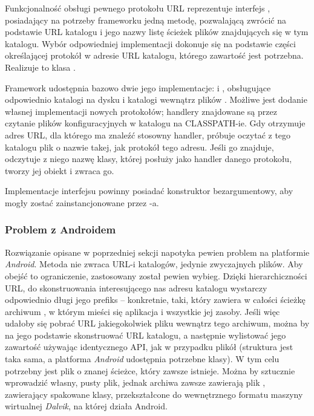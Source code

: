 Funkcjonalność obsługi pewnego protokołu URL reprezentuje interfejs ,
posiadający na potrzeby frameworku jedną metodę, pozwalającą zwrócić na podstawie URL katalogu i
jego nazwy listę ścieżek plików znajdujących się w tym katalogu. Wybór odpowiedniej implementacji
dokonuje się na podstawie części określającej protokół w adresie URL katalogu, którego zawartość
jest potrzebna. Realizuje to klasa .

Framework udostępnia bazowo dwie jego implementacje:  i
, obsługujące odpowiednio katalogi na dysku i katalogi wewnątrz plików
. Możliwe jest dodanie własnej implementacji nowych protokołów; handlery znajdowane są
przez czytanie plików konfiguracyjnych w katalogu
 na CLASSPATH-ie. Gdy
 otrzymuje adres URL, dla którego ma znaleźć stosowny handler, próbuje
oczytać z tego katalogu plik o nazwie takej, jak protokół tego adresu. Jeśli go znajduje, odczytuje
z niego nazwę klasy, której posłuży jako handler danego protokołu, tworzy jej obiekt i zwraca go.

\begin{Important}
  Implementacje interfejsu  powinny posiadać konstruktor bezargumentowy,
  aby mogły zostać zainstancjonowane przez -a.
\end{Important}


\subsubsection{Problem z Androidem}

Rozwiązanie opisane w poprzedniej sekcji napotyka pewien problem na platformie \emph{Android}.
Metoda  nie zwraca URL-i katalogów, jedynie zwyczajnych plików. Aby
obejść to ograniczenie, zastosowany został pewien wybieg. Dzięki hierarchiczności URL, do
skonstruowania interesującego nas adresu katalogu wystarczy odpowiednio długi jego prefiks --
konkretnie, taki, który zawiera w całości ścieżkę archiwum , w którym mieści się
aplikacja i wszystkie jej zasoby. Jeśli więc udałoby się pobrać URL jakiegokolwiek pliku wewnątrz
tego archiwum, można by na jego podstawie skonstruować URL katalogu, a następnie wylistować jego
zawartość używając identycznego API, jak w przypadku plikół  (struktura jest taka sama, a
platforma \emph{Android} udostępnia potrzebne klasy). W tym celu potrzebny jest plik o znanej
ścieżce, który zawsze istnieje. Można by sztucznie wprowadzić własny, pusty plik, jednak archiwa
 zawsze zawierają plik , zawierający spakowane klasy, przekształcone do
wewnętrznego formatu maszyny wirtualnej \emph{Dalvik}, na której działa Android.

